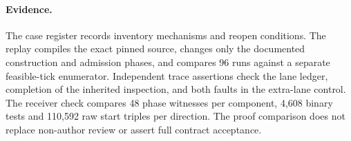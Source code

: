 \documentclass[11pt]{article}
\begin{document}
\paragraph{Evidence.}
The case register records inventory mechanisms and reopen conditions. The replay compiles the exact pinned source, changes only the documented construction and admission phases, and compares 96 runs against a separate feasible-tick enumerator. Independent trace assertions check the lane ledger, completion of the inherited inspection, and both faults in the extra-lane control. The receiver check compares 48 phase witnesses per component, 4,608 binary tests and 110,592 raw start triples per direction. The proof comparison does not replace non-author review or assert full contract acceptance.
\end{document}

